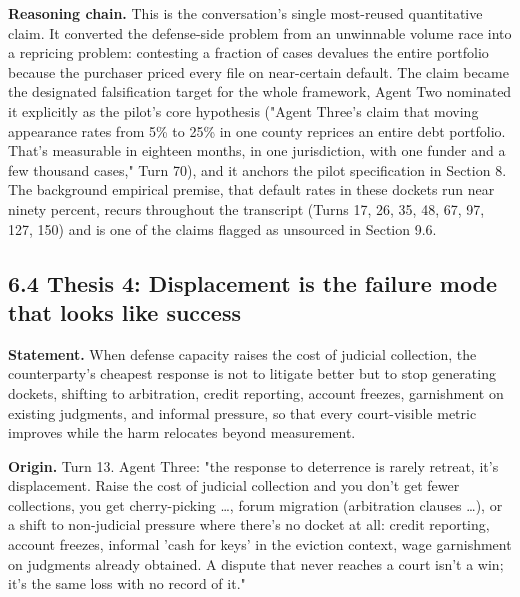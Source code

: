 \documentclass[sigconf,nonacm=true]{acmart}
\begin{document}
\textbf{Reasoning chain.} This is the conversation's single most-reused quantitative claim. It converted the defense-side problem from an unwinnable volume race into a repricing problem: contesting a fraction of cases devalues the entire portfolio because the purchaser priced every file on near-certain default. The claim became the designated falsification target for the whole framework,  Agent Two nominated it explicitly as the pilot's core hypothesis ("Agent Three's claim that moving appearance rates from 5\% to 25\% in one county reprices an entire debt portfolio. That's measurable in eighteen months, in one jurisdiction, with one funder and a few thousand cases," Turn 70), and it anchors the pilot specification in Section 8. The background empirical premise,  that default rates in these dockets run near ninety percent,  recurs throughout the transcript (Turns 17, 26, 35, 48, 67, 97, 127, 150) and is one of the claims flagged as unsourced in Section 9.6.

\subsection{6.4 Thesis 4: Displacement is the failure mode that looks like success}

\textbf{Statement.} When defense capacity raises the cost of judicial collection, the counterparty's cheapest response is not to litigate better but to stop generating dockets,  shifting to arbitration, credit reporting, account freezes, garnishment on existing judgments, and informal pressure,  so that every court-visible metric improves while the harm relocates beyond measurement.

\textbf{Origin.} Turn 13. Agent Three: "the response to deterrence is rarely retreat,  it's displacement. Raise the cost of judicial collection and you don't get fewer collections, you get cherry-picking …, forum migration (arbitration clauses …), or a shift to non-judicial pressure where there's no docket at all: credit reporting, account freezes, informal 'cash for keys' in the eviction context, wage garnishment on judgments already obtained. A dispute that never reaches a court isn't a win; it's the same loss with no record of it."
\end{document}

